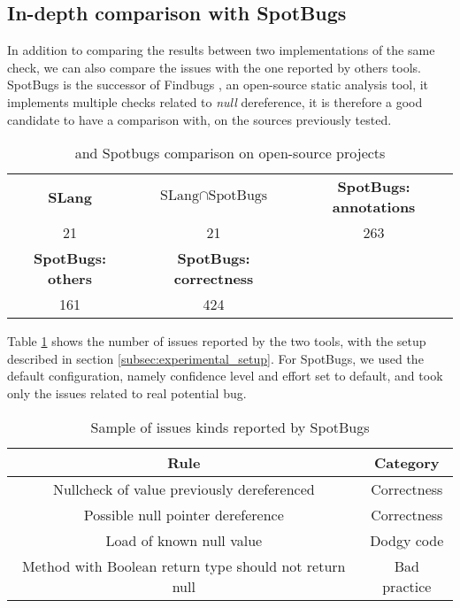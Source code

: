 \subsection{In-depth comparison with SpotBugs}
\label{subsec:indpeth_comparison_spotbugs}

In addition to comparing the results between two implementations of the same check, we can also compare the issues with the one reported by others tools.
SpotBugs \cite{spotBugs:2019:Online} is the successor of Findbugs \cite{FindBugs:2019:Online}, an open-source static analysis tool, it implements multiple checks related to \emph{null} dereference, it is therefore a good candidate to have a comparison with, on the sources previously tested.

\begin{table}[h]
	\centering
	\caption{\slang{} and Spotbugs comparison on open-source projects}
	\label{table:slang_vs_spotbugs}
	\begin{tabular}{|c|c|c|}
		\hline
		\bf SLang & \bf $\text{SLang} \cap \text{SpotBugs}$ & \bf SpotBugs: annotations \\
		21 & 21 & 263 \\ \hline
		\bf SpotBugs: others & \bf SpotBugs: correctness & \\ 
		161 & 424 &  \\ \hline
	\end{tabular}
\end{table}

Table \ref{table:slang_vs_spotbugs} shows the number of issues reported by the two tools, with the setup described in section \ref{subsec:experimental_setup}. 
For SpotBugs, we used the default configuration, namely confidence level and effort set to default, and took only the issues related to real potential bug.

\begin{table}[h]
	\centering
	\caption{Sample of issues kinds reported by SpotBugs}
	\label{table:spotbugs-rules}
	\begin{tabular}{|c|c|}
		\hline
		\bf Rule & \bf Category\\ \hline
		Nullcheck of value previously dereferenced & Correctness  \\
		Possible null pointer dereference & Correctness  \\
		Load of known null value & Dodgy code \\
		Method with Boolean return type should not return null & Bad practice \\ \hline
	\end{tabular}
\end{table}

